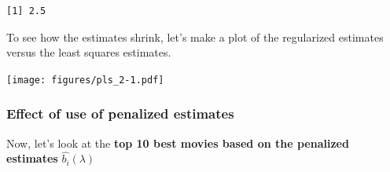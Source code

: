 \documentclass[
]{article}
\newenvironment{Shaded}{}{}
\newcommand{\AttributeTok}[1]{\textcolor[rgb]{0.49,0.56,0.16}{#1}}
\newcommand{\DecValTok}[1]{\textcolor[rgb]{0.25,0.63,0.44}{#1}}
\newcommand{\FloatTok}[1]{\textcolor[rgb]{0.25,0.63,0.44}{#1}}
\newcommand{\FunctionTok}[1]{\textcolor[rgb]{0.02,0.16,0.49}{#1}}
\newcommand{\NormalTok}[1]{#1}
\newcommand{\OtherTok}[1]{\textcolor[rgb]{0.00,0.44,0.13}{#1}}
\newcommand{\SpecialCharTok}[1]{\textcolor[rgb]{0.25,0.44,0.63}{#1}}
\begin{document}
\begin{verbatim}
[1] 2.5
\end{verbatim}

\begin{Shaded}
\end{Shaded}

To see how the estimates shrink, let's make a plot of the regularized
estimates versus the least squares estimates.

\begin{Shaded}
\end{Shaded}

\texttt{[image: figures/pls\_2-1.pdf]}

\newpage

\hypertarget{effect-of-use-of-penalized-estimates}{%
\subsubsection{Effect of use of penalized
estimates}\label{effect-of-use-of-penalized-estimates}}

Now, let's look at the \textbf{top 10 best movies based on the penalized
estimates} \(\hat{b_{i}}(\lambda)\)
\end{document}
